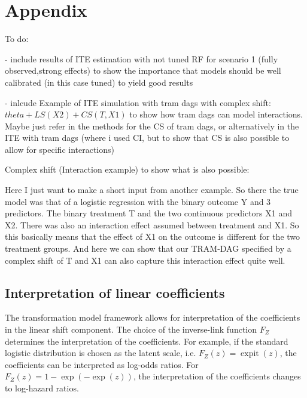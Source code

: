 



\chapter{Appendix}


To do:

- include results of ITE estimation with not tuned RF for scenario 1 (fully observed,strong effects) to show the importance that models should be well calibrated (in this case tuned) to yield good results

- inlcude Example of ITE simulation with tram dags with complex shift: $theta + LS(X2) + CS(T, X1)$ to show how tram dags can model interactions. Maybe just refer in the methods for the CS of tram dags, or alternatively in the ITE with tram dags (where i used CI, but to show that CS is also possible to allow for specific interactions)

Complex shift (Interaction example) to show what is also possible:

Here I just want to make a short input from another example. So there the true model was that of a logistic regression with the binary outcome Y and 3 predictors. The binary treatment T and the two continuous predictors X1 and X2. There was also an interaction effect assumed between treatment and X1. So this basically means that the effect of X1 on the outcome is different for the two treatment groups.
And here we can show that our TRAM-DAG specified by a complex shift of T and X1 can also capture this interaction effect quite well.






\section{Interpretation of linear coefficients} \label{sec:interpretation_linear_coefficients}

The transformation model framework allows for interpretation of the coefficients in the linear shift component. The choice of the inverse-link function $F_Z$ determines the interpretation of the coefficients. For example, if the standard logistic distribution is chosen as the latent scale, i.e. $F_Z(z) = \operatorname{expit}(z)$, the coefficients can be interpreted as log-odds ratios. For $F_Z(z) = 1-\exp(-\exp(z))$, the interpretation of the coefficients changes to log-hazard ratios.

